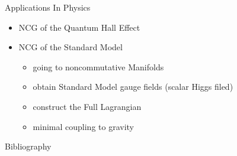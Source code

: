 \documentclass[fleqn]{beamer}
\begin{document}
    \begin{frame}{Applications In Physics}
        \begin{itemize}
            \item NCG of the Quantum Hall Effect
            \item NCG of the Standard Model
                \begin{itemize}
                    \item[\bullet] going to noncommutative Manifolds
                    \item[\bullet] obtain Standard Model gauge fields (scalar Higgs filed)
                    \item[\bullet] construct the Full Lagrangian
                    \item[\bullet] minimal coupling to gravity
                \end{itemize}
        \end{itemize}
    \end{frame}

    \begin{frame}{Bibliography}
        \nocite{ncgwalter}
        \nocite{liealgebra}
        \nocite{ncg4pages}
        \nocite{ncgshort}
        \printbibliography
    \end{frame}
\end{document}
